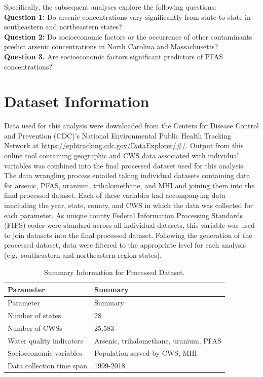 \documentclass[12pt,]{article}
\begin{document}
Specifically, the subsequent analyses explore the following questions:\\
\textbf{Question 1:} Do arsenic concentrations vary significantly from
state to state in southeastern and northeastern states?\\
\textbf{Question 2:} Do socioeconomic factors or the occurrence of other
contaminants predict arsenic concentrations in North Carolina and
Massachusetts?\\
\textbf{Question 3.} Are socioeconomic factors significant predictors of
PFAS concentrations?

\newpage

\hypertarget{dataset-information}{%
\section{Dataset Information}\label{dataset-information}}

Data used for this analysis were downloaded from the Centers for Disease
Control and Prevention (CDC)'s National Environmental Public Health
Tracking Network at \url{https://ephtracking.cdc.gov/DataExplorer/\#/}.
Output from this online tool containing geographic and CWS data
associated with individual variables was combined into the final
processed dataset used for this analysis.\\
The data wrangling process entailed taking individual datasets
containing data for arsenic, PFAS, uranium, trihalomethane, and MHI and
joining them into the final processed dataset. Each of these variables
had accompanying data inncluding the year, state, county, and CWS in
which the data was collected for each parameter. As unique county
Federal Information Processing Standards (FIPS) codes were standard
across all individual datasets, this variable was used to join datasets
into the final processed dataset. Following the generation of the
processed dataset, data were filtered to the appropriate level for each
analysis (e.g.~southeastern and northeastern region states).

\begin{quote}
\end{quote}

\begin{longtable}[]{@{}ll@{}}
\caption{Summary Information for Processed Dataset.}\tabularnewline
\toprule
Parameter & Summary\tabularnewline
\midrule
\endfirsthead
\toprule
Parameter & Summary\tabularnewline
\midrule
\endhead
Number of states & 28\tabularnewline
Number of CWSs & 25,583\tabularnewline
Water quality indicators & Arsenic, trihalomethane, uranium,
PFAS\tabularnewline
Socioeconomic variables & Population served by CWS, MHI\tabularnewline
Data collection time span & 1999-2018\tabularnewline
\bottomrule
\end{longtable}
\end{document}

